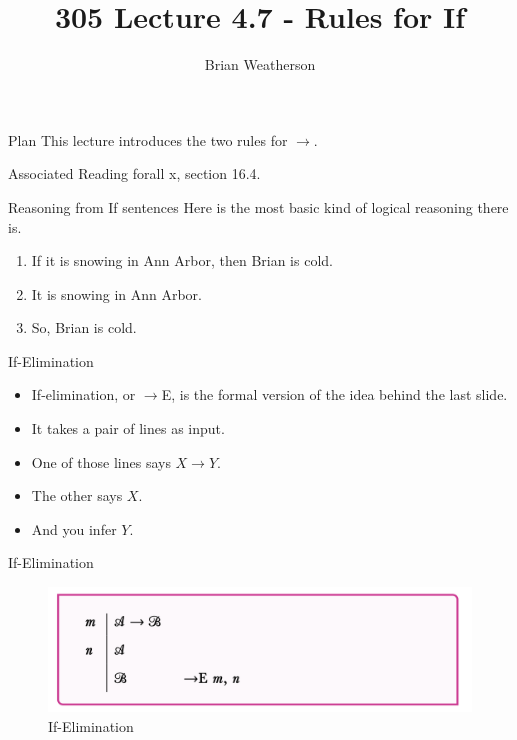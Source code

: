 \documentclass[
  ignorenonframetext,
]{beamer}
\title{305 Lecture 4.7 - Rules for If}
\author{Brian Weatherson}
\date{}
\providecommand{\tightlist}{%
  \setlength{\itemsep}{0pt}\setlength{\parskip}{0pt}}
\renewcommand{\,}{\text{, }}
\begin{document}
\frame{\titlepage}

\begin{frame}{Plan}
\protect\hypertarget{plan}{}
This lecture introduces the two rules for \(\rightarrow\).
\end{frame}

\begin{frame}{Associated Reading}
\protect\hypertarget{associated-reading}{}
forall x, section 16.4.
\end{frame}

\begin{frame}{Reasoning from If sentences}
\protect\hypertarget{reasoning-from-if-sentences}{}
Here is the most basic kind of logical reasoning there is.

\begin{enumerate}
\tightlist
\item
  If it is snowing in Ann Arbor, then Brian is cold.
\item
  It is snowing in Ann Arbor.
\item
  So, Brian is cold.
\end{enumerate}
\end{frame}

\begin{frame}{If-Elimination}
\protect\hypertarget{if-elimination}{}
\begin{itemize}
\tightlist
\item
  If-elimination, or \(\rightarrow\)E, is the formal version of the idea
  behind the last slide.
\item
  It takes a pair of lines as input.
\item
  One of those lines says \(X \rightarrow Y\).
\item
  The other says \(X\).
\item
  And you infer \(Y\).
\end{itemize}
\end{frame}

\begin{frame}{If-Elimination}
\protect\hypertarget{if-elimination-1}{}
\begin{figure}
\centering
\includegraphics{4_7a.png}
\caption{If-Elimination}
\end{figure}
\end{frame}
\end{document}
